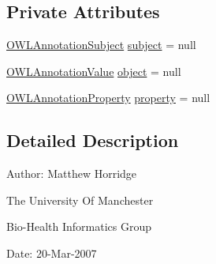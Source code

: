 \subsection*{Private Attributes}
\begin{DoxyCompactItemize}
\item 
\hyperlink{interfaceorg_1_1semanticweb_1_1owlapi_1_1model_1_1_o_w_l_annotation_subject}{O\-W\-L\-Annotation\-Subject} \hyperlink{classorg_1_1coode_1_1owlapi_1_1owlxmlparser_1_1_o_w_l_annotation_assertion_element_handler_a1d5570b5846fde5b4b6b0e5a2cd42b07}{subject} = null
\item 
\hyperlink{interfaceorg_1_1semanticweb_1_1owlapi_1_1model_1_1_o_w_l_annotation_value}{O\-W\-L\-Annotation\-Value} \hyperlink{classorg_1_1coode_1_1owlapi_1_1owlxmlparser_1_1_o_w_l_annotation_assertion_element_handler_aef3cc521e0cba454cb282c58cf11e501}{object} = null
\item 
\hyperlink{interfaceorg_1_1semanticweb_1_1owlapi_1_1model_1_1_o_w_l_annotation_property}{O\-W\-L\-Annotation\-Property} \hyperlink{classorg_1_1coode_1_1owlapi_1_1owlxmlparser_1_1_o_w_l_annotation_assertion_element_handler_a006ba3f93dff50195f56472ea354d745}{property} = null
\end{DoxyCompactItemize}


\subsection{Detailed Description}
Author\-: Matthew Horridge\par
 The University Of Manchester\par
 Bio-\/\-Health Informatics Group\par
 Date\-: 20-\/\-Mar-\/2007\par
\par
 

